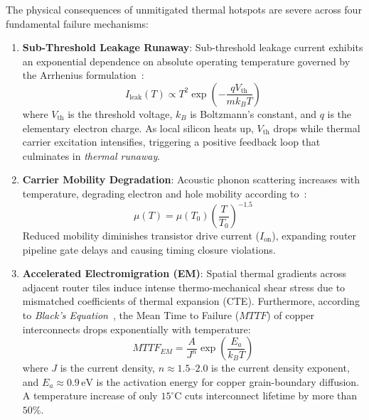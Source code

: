 The physical consequences of unmitigated thermal hotspots are severe across four fundamental failure mechanisms:
\begin{enumerate}
    \item \textbf{Sub-Threshold Leakage Runaway}: Sub-threshold leakage current exhibits an exponential dependence on absolute operating temperature governed by the Arrhenius formulation~\cite{Dennard1974,Skadron2003}:
    \begin{equation}
        I_{\mathrm{leak}}(T) \propto T^2 \exp\left(-\frac{q V_{\mathrm{th}}}{m k_B T}\right)
        \label{eq:arrhenius-leakage}
    \end{equation}
    where $V_{\mathrm{th}}$ is the threshold voltage, $k_B$ is Boltzmann's constant, and $q$ is the elementary electron charge. As local silicon heats up, $V_{\mathrm{th}}$ drops while thermal carrier excitation intensifies, triggering a positive feedback loop that culminates in \emph{thermal runaway}.
    
    \item \textbf{Carrier Mobility Degradation}: Acoustic phonon scattering increases with temperature, degrading electron and hole mobility according to~\cite{Borkar1999}:
    \begin{equation}
        \mu(T) = \mu(T_0) \left(\frac{T}{T_0}\right)^{-1.5}
        \label{eq:mobility-degradation}
    \end{equation}
    Reduced mobility diminishes transistor drive current ($I_{\mathrm{on}}$), expanding router pipeline gate delays and causing timing closure violations.
    
    \item \textbf{Accelerated Electromigration (EM)}: Spatial thermal gradients across adjacent router tiles induce intense thermo-mechanical shear stress due to mismatched coefficients of thermal expansion (CTE). Furthermore, according to \emph{Black's Equation}~\cite{Black1969}, the Mean Time to Failure ($MTTF$) of copper interconnects drops exponentially with temperature:
    \begin{equation}
        MTTF_{EM} = \frac{A}{J^n} \exp\left(\frac{E_a}{k_B T}\right)
        \label{eq:blacks-equation}
    \end{equation}
    where $J$ is the current density, $n \approx 1.5\text{--}2.0$ is the current density exponent, and $E_a \approx 0.9\,\mathrm{eV}$ is the activation energy for copper grain-boundary diffusion. A temperature increase of only $15^\circ\mathrm{C}$ cuts interconnect lifetime by more than $50\%$.


\end{enumerate}
